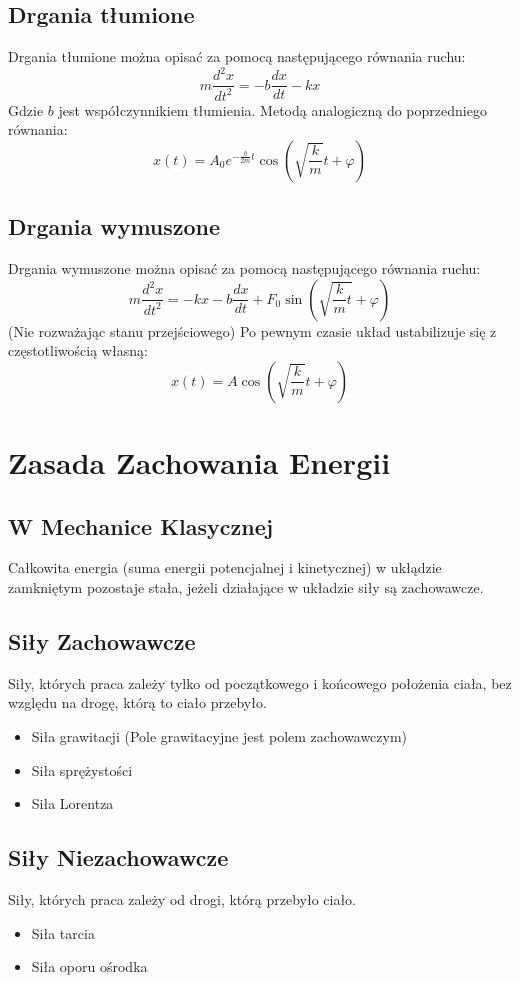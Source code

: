 \documentclass{article}
\theoremstyle{definition}
\theoremstyle{definition}
\theoremstyle{definition}
\theoremstyle{definition}
\begin{document}
\subsection{Drgania tłumione}
Drgania tłumione można opisać za pomocą następującego równania ruchu:
\[ m \frac{d^2 x}{dt^2} = - b \frac{dx}{dt} - kx \]
Gdzie $b$ jest współczynnikiem tłumienia. Metodą analogiczną do poprzedniego równania:
\[
\boxed {
x(t) = A_0 e^{-\frac{b}{2m}t}\cos\left(\sqrt{\frac{k}{m}}t + \varphi\right)
}\]

\subsection{Drgania wymuszone}
Drgania wymuszone można opisać za pomocą następującego równania ruchu:
\[ m \frac{d^2 x}{dt^2} = -kx -b \frac{dx}{dt} + F_0 \sin\left(\sqrt{\frac{k}{m}t} + \varphi\right)\]
(Nie rozważając stanu przejściowego) Po pewnym czasie układ ustabilizuje się z częstotliwością własną:
\[
\boxed {
x(t) = A \cos\left(\sqrt{\frac{k}{m}} t + \varphi\right)
}\]

\section{Zasada Zachowania Energii}


\subsection{W Mechanice Klasycznej}

Całkowita energia (suma energii potencjalnej i kinetycznej) w ukłądzie zamkniętym pozostaje stała, jeżeli działające w układzie siły są zachowawcze.

\subsection{Siły Zachowawcze}
Siły, których praca zależy tylko od początkowego i końcowego położenia ciała, bez względu na drogę, którą to ciało przebyło.
\begin{itemize}
    \item Siła grawitacji (Pole grawitacyjne jest polem zachowawczym)
    \item Siła sprężystości
    \item Siła Lorentza
\end{itemize}

\subsection{Siły Niezachowawcze}
Siły, których praca zależy od drogi, którą przebyło ciało.
\begin{itemize}
    \item Siła tarcia
    \item Siła oporu ośrodka
\end{itemize}
\end{document}
